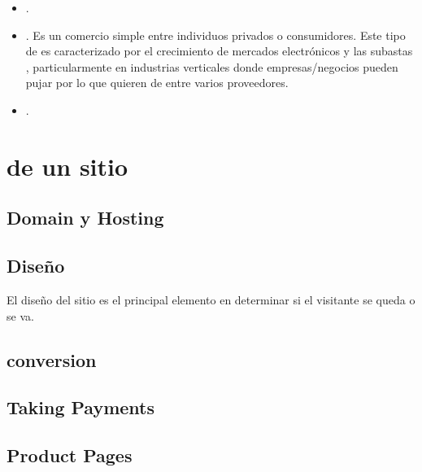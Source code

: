 \begin{itemize}
	\item \textbf{\gtog}.

	\item \textbf{\ctoc}. Es un comercio simple entre individuos privados o consumidores. Este tipo de \ecommerce es caracterizado por el crecimiento de mercados electrónicos y las subastas \online, particularmente en industrias verticales donde empresas/negocios pueden pujar por lo que quieren de entre varios proveedores.

	\item \textbf{\mcommerce}.
	
\end{itemize}

\section{\keyelements de un sitio \ecommerce \cite{inbook_ecommerce_keyelements}}

\subsection{Domain y Hosting}
\subsection{Diseño}
El diseño del sitio es el principal elemento en determinar si el visitante se queda o se va.

\subsection{\usability}
\subsection{conversion}
\subsection{\checkout}
\subsection{Taking Payments}
\subsection{Product Pages}
